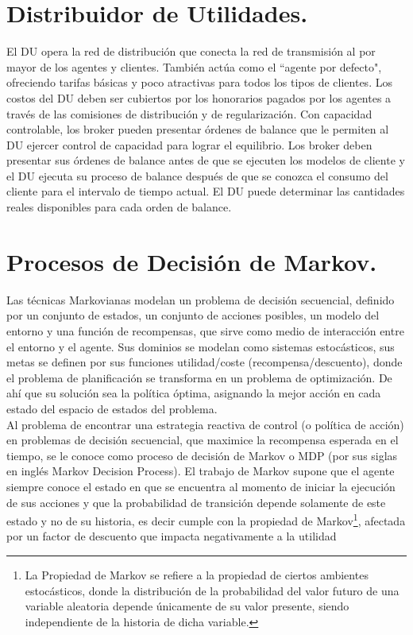 \section{Distribuidor de Utilidades.}
El DU opera la red de distribución que conecta la red de transmisión al por mayor de los agentes y clientes. También actúa como el “agente por defecto", ofreciendo tarifas básicas y poco atractivas para todos los tipos de clientes. Los  costos del DU deben ser cubiertos por los honorarios pagados por los agentes a través de las comisiones de distribución y de regularización. Con capacidad controlable, los broker pueden presentar órdenes de balance que le permiten al DU ejercer control de capacidad para lograr el equilibrio. Los broker deben presentar sus órdenes de balance antes de que se ejecuten los modelos de cliente y el DU ejecuta su proceso de balance después de que se conozca el consumo del cliente para el intervalo de tiempo actual. El DU puede determinar las cantidades reales disponibles para cada orden de balance.

\section{Procesos de Decisión de Markov.}
Las técnicas Markovianas modelan un problema de decisión secuencial, definido por un conjunto de estados, un conjunto de acciones posibles, un modelo del entorno y una función de recompensas, que sirve como medio de interacción entre el entorno y el agente. Sus dominios se modelan como sistemas estocásticos, sus metas se definen por sus funciones utilidad/coste (recompensa/descuento), donde el problema de planificación se transforma en un problema de optimización. De ahí que su solución sea la política óptima, asignando la mejor acción en cada estado del espacio de estados del problema.\\

Al problema de encontrar una estrategia reactiva de control (o política de acción) en problemas de decisión secuencial, que maximice la recompensa esperada en el tiempo, se le conoce como proceso de decisión de Markov o MDP (por sus siglas en inglés Markov Decision Process). El trabajo de Markov supone que el agente siempre conoce el estado en que se encuentra al momento de iniciar la ejecución de sus acciones y que la probabilidad de transición depende solamente de este estado y no de su historia, es decir cumple con la propiedad de Markov\footnote{La Propiedad de Markov se refiere a la propiedad de ciertos ambientes estocásticos, donde la distribución de la probabilidad del valor futuro de una variable aleatoria depende únicamente de su valor presente, siendo independiente de la historia de dicha variable.}, afectada por un factor de descuento que impacta negativamente a la utilidad

